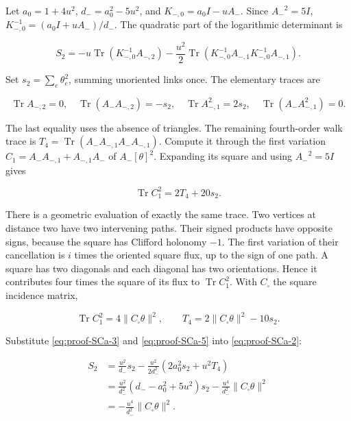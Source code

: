 \documentclass[aps,prx,onecolumn,10pt,notitlepage,nofootinbib,longbibliography]{revtex4-2}
\numberwithin{equation}{section}
\numberwithin{table}{section}
\begin{document}
Let \(a_0=1+4u^2\), \(d_-=a_0^2-5u^2\), and \(K_{-,0}=a_0I-u{A_-}\). Since \({A_-}^2=5I\), \(K_{-,0}^{-1}=(a_0I+u{A_-})/d_-\). The quadratic part of the logarithmic determinant is

\begin{equation}
 S_2=-u\operatorname{Tr}(K_{-,0}^{-1}A_{-,2})
       -\frac{u^2}{2}\operatorname{Tr}(K_{-,0}^{-1}A_{-,1}K_{-,0}^{-1}A_{-,1}).
 \label{eq:proof-SCa-2}
\end{equation}

Set \(s_2=\sum_e\theta_e^2\), summing unoriented links once. The elementary traces are

\begin{equation}
 \operatorname{Tr}A_{-,2}=0,\quad
 \operatorname{Tr}({A_-}A_{-,2})=-s_2,\quad
 \operatorname{Tr}A_{-,1}^2=2s_2,\quad
 \operatorname{Tr}({A_-}A_{-,1}^2)=0.
 \label{eq:proof-SCa-3}
\end{equation}

The last equality uses the absence of triangles. The remaining fourth-order walk trace is \(T_4=\operatorname{Tr}({A_-}A_{-,1}{A_-}A_{-,1})\). Compute it through the first variation \(C_1={A_-}A_{-,1}+A_{-,1}{A_-}\) of \({A_-}[\theta]^2\). Expanding its square and using \({A_-}^2=5I\) gives

\begin{equation}
 \operatorname{Tr}C_1^2=2T_4+20s_2.
 \label{eq:proof-SCa-4}
\end{equation}

There is a geometric evaluation of exactly the same trace. Two vertices at distance two have two intervening paths. Their signed products have opposite signs, because the square has Clifford holonomy \(-1\). The first variation of their cancellation is \(i\) times the oriented square flux, up to the sign of one path. A square has two diagonals and each diagonal has two orientations. Hence it contributes four times the square of its flux to \(\operatorname{Tr}C_1^2\). With \(C_\square\) the square incidence matrix,

\begin{equation}
 \operatorname{Tr}C_1^2=4\|C_\square\theta\|^2,
 \qquad T_4=2\|C_\square\theta\|^2-10s_2.
 \label{eq:proof-SCa-5}
\end{equation}

Substitute \eqref{eq:proof-SCa-3} and \eqref{eq:proof-SCa-5} into \eqref{eq:proof-SCa-2}:

\begin{equation}
 \begin{aligned}
 S_2
 &=\frac{u^2}{d_-}s_2
   -\frac{u^2}{2d_-^2}(2a_0^2s_2+u^2T_4)\\
 &=\frac{u^2}{d_-^2}
       (d_--a_0^2+5u^2)s_2
      -\frac{u^4}{d_-^2}\|C_\square\theta\|^2\\
 &=-\frac{u^4}{d_-^2}\|C_\square\theta\|^2.
 \end{aligned}
 \label{eq:proof-SCa-6}
\end{equation}
\end{document}
